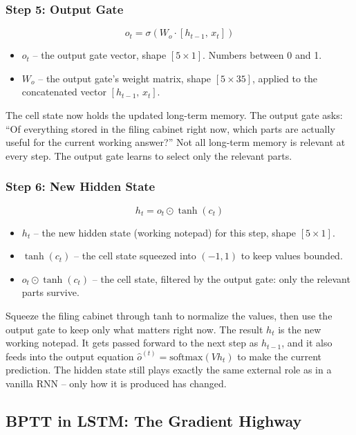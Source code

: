 \documentclass[12pt,a4paper]{article}
\begin{document}
\subsubsection{Step 5: Output Gate}

\[
o_t = \sigma(W_o \cdot [h_{t-1},\, x_t])
\]

\begin{itemize}
    \item $o_t$ -- the output gate vector, shape $[5 \times 1]$. Numbers between
    0 and 1.
    \item $W_o$ -- the output gate's weight matrix, shape $[5 \times 35]$, applied to
    the concatenated vector $[h_{t-1},\, x_t]$.
\end{itemize}

The cell state now holds the updated long-term memory. The output gate asks: ``Of
everything stored in the filing cabinet right now, which parts are actually useful
for the current working answer?'' Not all long-term memory is relevant at every step.
The output gate learns to select only the relevant parts.

\subsubsection{Step 6: New Hidden State}

\[
h_t = o_t \odot \tanh(c_t)
\]

\begin{itemize}
    \item $h_t$ -- the new hidden state (working notepad) for this step, shape
    $[5 \times 1]$.
    \item $\tanh(c_t)$ -- the cell state squeezed into $(-1, 1)$ to keep values
    bounded.
    \item $o_t \odot \tanh(c_t)$ -- the cell state, filtered by the output gate:
    only the relevant parts survive.
\end{itemize}

Squeeze the filing cabinet through tanh to normalize the values, then use the output
gate to keep only what matters right now. The result $h_t$ is the new working
notepad. It gets passed forward to the next step as $h_{t-1}$, and it also feeds into
the output equation $\hat{o}^{(t)} = \text{softmax}(V h_t)$ to make the current
prediction. The hidden state still plays exactly the same external role as in a vanilla
RNN -- only how it is produced has changed.

\subsection{BPTT in LSTM: The Gradient Highway}
\end{document}
